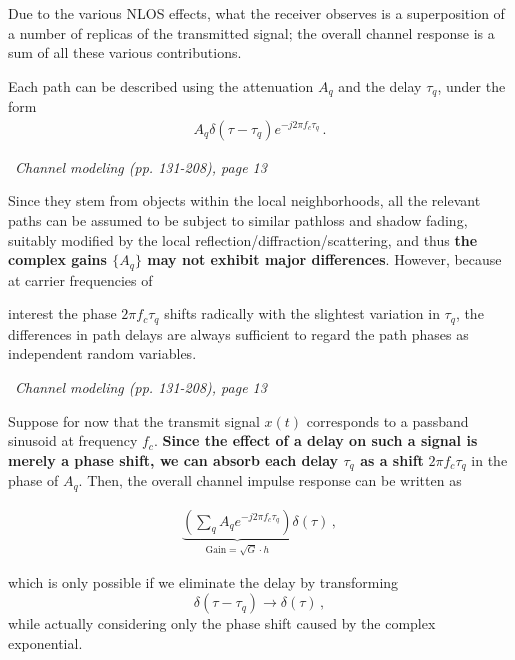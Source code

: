 \documentclass[a4paper, 12pt]{book}
\begin{document}
Due to the various NLOS effects, what the receiver observes is a superposition of a number of replicas of the transmitted signal; the overall channel response is a sum of all these various contributions.

Each path can be described using the attenuation $A_q$ and the delay $\tau_q$, under the form
\begin{align*}
A_q \delta(\tau - \tau_q) e^{-j 2\pi f_c \tau_q} \,.
\end{align*}

\begin{yellowbox}
\faBook\ \textit{Channel modeling (pp. 131-208), page 13}

Since they stem from objects within the local neighborhoods, all the relevant paths can be assumed to be subject to similar pathloss and shadow fading, suitably modified by the local reflection/diffraction/scattering, and thus \textbf{the complex gains $\{A_q\}$ may not exhibit major differences}. However, because at carrier frequencies of
\end{yellowbox}

interest the phase $2\pi f_c \tau_q$ shifts radically with the slightest variation in $\tau_q$, the differences in path delays are always sufficient to regard the path phases as independent random variables.

\begin{yellowbox}
\faBook\ \textit{Channel modeling (pp. 131-208), page 13}

Suppose for now that the transmit signal $x(t)$ corresponds to a passband sinusoid at frequency $f_c$. \textbf{Since the effect of a delay on such a signal is merely a phase shift, we can absorb each delay $\tau_q$ as a shift} $2\pi f_c \tau_q$ in the phase of $A_q$. Then, the overall channel impulse response can be written as

\begin{align}
\underbrace{\left( \sum_q A_q e^{-j 2\pi f_c \tau_q} \right)}_{\text{Gain} = \sqrt{G} \cdot h} \delta(\tau) \,, \tag{3.21}
\end{align}

which is only possible if we eliminate the delay by transforming
\[
\delta(\tau - \tau_q) \to \delta(\tau) \,,
\]
while actually considering only the phase shift caused by the complex exponential.
\end{yellowbox}
\end{document}
